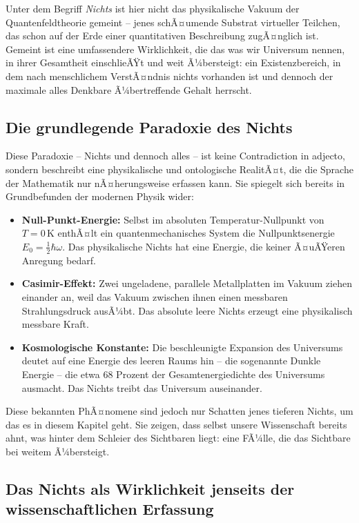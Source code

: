 ﻿\documentclass[12pt,a4paper]{report}
\begin{document}
Unter dem Begriff \emph{Nichts} ist hier nicht das physikalische Vakuum der Quantenfeldtheorie gemeint -- jenes schÃ¤umende Substrat virtueller Teilchen, das schon auf der Erde einer quantitativen Beschreibung zugÃ¤nglich ist. Gemeint ist eine umfassendere Wirklichkeit, die das was wir \glqq Universum\grqq{} nennen, in ihrer Gesamtheit einschlieÃŸt und weit Ã¼bersteigt: ein Existenzbereich, in dem nach menschlichem VerstÃ¤ndnis \glqq nichts\grqq{} vorhanden ist und dennoch der maximale alles Denkbare Ã¼bertreffende Gehalt herrscht.

\subsection{Die grundlegende Paradoxie des Nichts}

Diese Paradoxie -- Nichts und dennoch alles -- ist keine Contradiction in adjecto, sondern beschreibt eine physikalische und ontologische RealitÃ¤t, die die Sprache der Mathematik nur nÃ¤herungsweise erfassen kann. Sie spiegelt sich bereits in Grundbefunden der modernen Physik wider:

\begin{itemize}
	\item \textbf{Null-Punkt-Energie:} Selbst im absoluten Tempe\-ratur-Nullpunkt von $T = 0\,\text{K}$ enthÃ¤lt ein quantenmechanisches System die Nullpunktsenergie $E_0 = \frac{1}{2}\hbar\omega$. Das physikalische \glqq Nichts\grqq{} hat eine Energie, die keiner Ã¤uÃŸeren Anregung bedarf.
	\item \textbf{Casimir-Effekt:} Zwei ungeladene, parallele Metallplatten im Vakuum ziehen einander an, weil das Vakuum zwischen ihnen einen messbaren Strahlungsdruck ausÃ¼bt. Das absolute leere Nichts erzeugt eine physikalisch messbare Kraft.
	\item \textbf{Kosmologische Konstante:} Die beschleunigte Expansion des Universums deutet auf eine Energie des leeren Raums hin -- die sogenannte Dunkle Energie -- die etwa 68 Prozent der Gesamtenergiedichte des Universums ausmacht. Das Nichts treibt das Universum auseinander.
\end{itemize}

Diese bekannten PhÃ¤nomene sind jedoch nur Schatten jenes tieferen Nichts, um das es in diesem Kapitel geht. Sie zeigen, dass selbst unsere Wissenschaft bereits ahnt, was hinter dem Schleier des Sichtbaren liegt: eine FÃ¼lle, die das Sichtbare bei weitem Ã¼bersteigt.

\subsection{Das Nichts als Wirklichkeit jenseits der wissenschaftlichen Erfassung}
\end{document}
